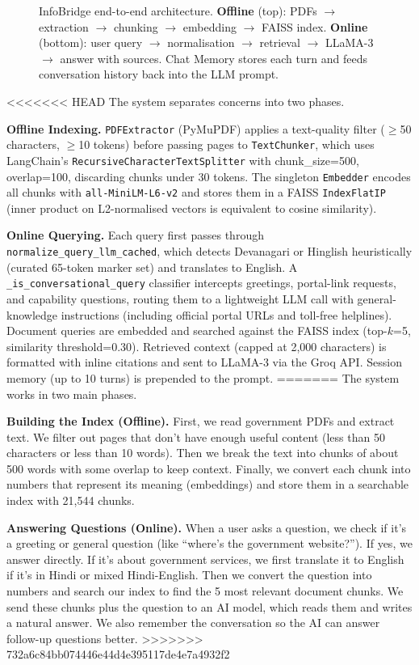 \documentclass[10pt,twocolumn]{article}
\begin{document}
\begin{figure}[t]
\begin{tikzpicture}
\end{tikzpicture}
\caption{InfoBridge end-to-end architecture.
  \textbf{Offline} (top): PDFs $\to$ extraction $\to$ chunking $\to$ embedding $\to$ FAISS index.
  \textbf{Online} (bottom): user query $\to$ normalisation $\to$ retrieval $\to$ LLaMA-3 $\to$ answer with sources.
  Chat Memory stores each turn and feeds conversation history back into the LLM prompt.}
\label{fig:arch}
\end{figure}




<<<<<<< HEAD
The system separates concerns into two phases.

\smallskip\noindent\textbf{Offline Indexing.}
\texttt{PDFExtractor} (PyMuPDF) applies a text-quality filter
($\geq$50 characters, $\geq$10 tokens) before passing pages to
\texttt{TextChunker}, which uses LangChain's
\texttt{RecursiveCharacterTextSplitter} with chunk\_size=500, overlap=100, discarding
chunks under 30 tokens.  The singleton \texttt{Embedder} encodes all chunks with
\texttt{all-MiniLM-L6-v2} and stores them in a FAISS \texttt{IndexFlatIP}
(inner product on L2-normalised vectors is equivalent to cosine similarity).

\smallskip\noindent\textbf{Online Querying.}
Each query first passes through \texttt{normalize\_query\_llm\_cached}, which detects
Devanagari or Hinglish heuristically (curated 65-token marker set) and translates
to English.  A \texttt{\_is\_conversational\_query} classifier intercepts greetings,
portal-link requests, and capability questions, routing them to a lightweight LLM
call with general-knowledge instructions (including official portal URLs and
toll-free helplines).  Document queries are embedded and searched against the FAISS
index (top-$k$=5, similarity threshold=0.30).  Retrieved context (capped at 2,000
characters) is formatted with inline citations and sent to LLaMA-3 via the Groq API.
Session memory (up to 10 turns) is prepended to the prompt.
=======
The system works in two main phases.

\smallskip\noindent\textbf{Building the Index (Offline).}
First, we read government PDFs and extract text. We filter out pages that don't have enough useful content (less than 50 characters or less than 10 words). Then we break the text into chunks of about 500 words with some overlap to keep context. Finally, we convert each chunk into numbers that represent its meaning (embeddings) and store them in a searchable index with 21,544 chunks.

\smallskip\noindent\textbf{Answering Questions (Online).}
When a user asks a question, we check if it's a greeting or general question (like ``where's the government website?''). If yes, we answer directly. If it's about government services, we first translate it to English if it's in Hindi or mixed Hindi-English. Then we convert the question into numbers and search our index to find the 5 most relevant document chunks. We send these chunks plus the question to an AI model, which reads them and writes a natural answer. We also remember the conversation so the AI can answer follow-up questions better.
>>>>>>> 732a6c84bb074446e44d4e395117de4e7a4932f2
\end{document}
